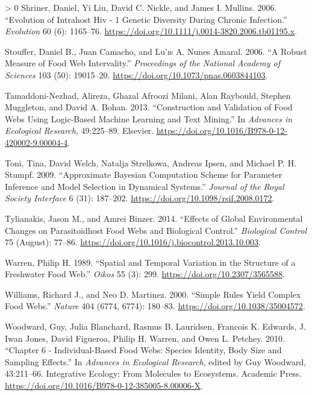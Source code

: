 \documentclass{article}
\newlength{\cslhangindent}
\newenvironment{CSLReferences}[3] %
 {%
  \setlength{\parindent}{0pt}
  \ifodd #1 \everypar{\setlength{\hangindent}{\cslhangindent}}\ignorespaces\fi
  \ifnum #2 > 0
  \setlength{\parskip}{#2\baselineskip}
  \fi
 }%
 {}
\begin{document}
\begin{CSLReferences}{1}{0}
\leavevmode\hypertarget{ref-shrinerEvolutionIntrahostHiv2006}{}%
Shriner, Daniel, Yi Liu, David C. Nickle, and James I. Mullins. 2006.
{``Evolution of {Intrahost Hiv} - 1 {Genetic Diversity During Chronic
Infection}.''} \emph{Evolution} 60 (6): 1165--76.
\url{https://doi.org/10.1111/j.0014-3820.2006.tb01195.x}.

\leavevmode\hypertarget{ref-stoufferRobustMeasureFood2006}{}%
Stouffer, Daniel B., Juan Camacho, and Lu'ıs A. Nunes Amaral. 2006. {``A
Robust Measure of Food Web Intervality.''} \emph{Proceedings of the
National Academy of Sciences} 103 (50): 19015--20.
\url{https://doi.org/10.1073/pnas.0603844103}.

\leavevmode\hypertarget{ref-tamaddoni-nezhadConstructionValidationFood2013}{}%
Tamaddoni-Nezhad, Alireza, Ghazal Afroozi Milani, Alan Raybould, Stephen
Muggleton, and David A. Bohan. 2013. {``Construction and {Validation} of
{Food Webs Using Logic}-{Based Machine Learning} and {Text Mining}.''}
In \emph{Advances in {Ecological Research}}, 49:225--89. {Elsevier}.
\url{https://doi.org/10.1016/B978-0-12-420002-9.00004-4}.

\leavevmode\hypertarget{ref-toniApproximateBayesianComputation2009}{}%
Toni, Tina, David Welch, Natalja Strelkowa, Andreas Ipsen, and Michael
P. H. Stumpf. 2009. {``Approximate {Bayesian} Computation Scheme for
Parameter Inference and Model Selection in Dynamical Systems.''}
\emph{Journal of the Royal Society Interface} 6 (31): 187--202.
\url{https://doi.org/10.1098/rsif.2008.0172}.

\leavevmode\hypertarget{ref-tylianakisEffectsGlobalEnvironmental2014}{}%
Tylianakis, Jason M., and Amrei Binzer. 2014. {``Effects of Global
Environmental Changes on Parasitoid{}host Food Webs and Biological
Control.''} \emph{Biological Control} 75 (August): 77--86.
\url{https://doi.org/10.1016/j.biocontrol.2013.10.003}.

\leavevmode\hypertarget{ref-warrenSpatialTemporalVariation1989}{}%
Warren, Philip H. 1989. {``Spatial and {Temporal Variation} in the
{Structure} of a {Freshwater Food Web}.''} \emph{Oikos} 55 (3): 299.
\url{https://doi.org/10.2307/3565588}.

\leavevmode\hypertarget{ref-williamsSimpleRulesYield2000}{}%
Williams, Richard J., and Neo D. Martinez. 2000. {``Simple Rules Yield
Complex Food Webs.''} \emph{Nature} 404 (6774, 6774): 180--83.
\url{https://doi.org/10.1038/35004572}.

\leavevmode\hypertarget{ref-woodwardChapterIndividualBasedFood2010}{}%
Woodward, Guy, Julia Blanchard, Rasmus B. Lauridsen, Francois K.
Edwards, J. Iwan Jones, David Figueroa, Philip H. Warren, and Owen L.
Petchey. 2010. {``Chapter 6 - {Individual}-{Based Food Webs}: {Species
Identity}, {Body Size} and {Sampling Effects}.''} In \emph{Advances in
{Ecological Research}}, edited by Guy Woodward, 43:211--66. Integrative
{Ecology}: {From Molecules} to {Ecosystems}. {Academic Press}.
\url{https://doi.org/10.1016/B978-0-12-385005-8.00006-X}.


\end{CSLReferences}
\end{document}
